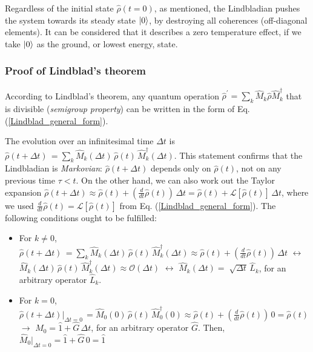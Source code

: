 \documentclass[11pt]{article}
\numberwithin{equation}{section} %
\numberwithin{figure}{section} %
\begin{document}
\begin{appendices}
\begin{itemize}
\begin{equation}
\end{equation}
Regardless of the initial state $\hat{\rho}(t=0)$, as mentioned, the Lindbladian pushes the system towards its steady state $\ket{0}$, by destroying all coherences (off-diagonal elements). It can be considered that it describes a zero temperature effect, if we take $\ket{0}$ as the ground, or lowest energy, state.
\end{itemize}

\subsubsection{Proof of Lindblad's theorem}
According to Lindblad's theorem, any quantum operation $\hat{\rho}^\prime=\sum_k\hat{M}_{k}\hat{\rho}\hat{M}_{k}^\dagger$ that is divisible (\emph{semigroup property}) can be written in the form of Eq. (\ref{Lindblad_general_form}). 

The evolution over an infinitesimal time $\Delta t$ is $\hat{\rho}(t+\Delta t)\,=\sum_k\hat{M}_{k}(\Delta t)\,\hat{\rho}(t)\,\hat{M}_{k}^\dagger(\Delta t)$. This statement confirms that the Lindbladian is \emph{Markovian}: $\hat{\rho}(t+\Delta t)$ depends only on $\hat{\rho}(t)$, not on any previous time $\tau<t$. On the other hand, we can also work out the Taylor expansion $\hat{\rho}(t+\Delta t)\approx \hat{\rho}(t)+(\frac{d}{dt}\hat{\rho}(t))\,\Delta t= \hat{\rho}(t)+\mathcal{L}[\hat{\rho}(t)]\,\Delta t$, where we used  $\frac{d}{dt}\hat{\rho}(t)=\mathcal{L}[\hat{\rho}(t)]$ from Eq. (\ref{Lindblad_general_form}). The following conditions ought to be fulfilled:
\begin{itemize}
\item For $k\neq 0$, $\hat{\rho}(t+\Delta t)\,=\sum_k\hat{M}_{k}(\Delta t)\,\hat{\rho}(t)\,\hat{M}_{k}^\dagger(\Delta t) \approx \hat{\rho}(t)+(\frac{d}{dt}\hat{\rho}(t))\,\Delta t$ $\leftrightarrow$ $\hat{M}_{k}(\Delta t)\,\hat{\rho}(t)\,\hat{M}_{k}^\dagger(\Delta t) \approx \mathcal{O}(\Delta t)$ $\leftrightarrow$ $\hat{M}_{k}(\Delta t)=\sqrt[]{\Delta t}\,\hat{L}_k$, for an arbitrary operator $\hat{L}_k$.
\item For $k= 0$, $\hat{\rho}(t+\Delta t)|_{\Delta t=0}\,=\hat{M}_{0}(0)\,\hat{\rho}(t)\,\hat{M}_{0}^\dagger(0) \approx \hat{\rho}(t)+(\frac{d}{dt}\hat{\rho}(t))\,0=\hat{\rho}(t)$ $\rightarrow$ $\hat{M}_{0}=\hat{1}+\hat{G}\,\Delta t$, for an arbitrary operator $\hat{G}$. Then, $\hat{M}_{0}|_{\Delta t = 0}=\hat{1}+\hat{G}\,0 = \hat{1}$
\end{itemize}


\end{appendices}
\end{document}
